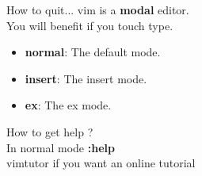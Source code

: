 \documentclass{beamer}
\begin{document}
\begin{frame}{How to quit...}
	vim is a \textbf{modal} editor. \\ \pause
	You will benefit if you touch type.\\ \pause
	\begin{itemize}
		\item {
				\textbf{normal}: The default mode.
				\pause
				}
			\item {   
				\textbf{insert}: The insert mode.
				\pause
			}
		\item {
				\textbf{ex}: The ex mode.
				\pause
			}
	\end{itemize}
	How to get \alert{help }?\\ \pause
	In normal mode \textbf{:help}\\
	\alert{vimtutor} if you want an online tutorial
\end{frame}
\end{document}
